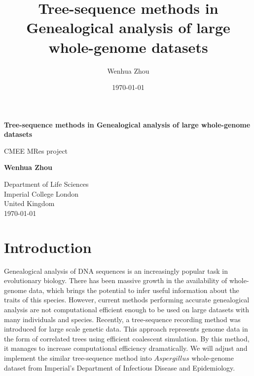 \documentclass[11pt]{article}
\begin{document}
\begin{titlepage}
   \begin{center}
       \vspace*{1cm}
 
       {\huge \textbf{Tree-sequence methods in Genealogical analysis of large whole-genome datasets}}
       
       \vspace{0.5cm}
       
       CMEE MRes project
       
       \vspace{1.5cm}
 
       \textbf{Wenhua Zhou}
       
       \vspace{0.5cm}
       
       
       \vspace{1.5cm}
       
       
       \vspace{0.5cm}
       
       \vfill
 
 
       \vspace{0.8cm}
 
 
       Department of Life Sciences\\
       Imperial College London\\
       United Kingdom\\
       \today
 
   \end{center}
\end{titlepage}


\title{Tree-sequence methods in Genealogical analysis of large whole-genome datasets}
\author{Wenhua Zhou}
\date{\today}

\section{Introduction}
Genealogical analysis of DNA sequences is an increasingly popular task in evolutionary biology. There has been massive growth in the availability of whole-genome data, which brings the potential to infer useful information about the traits of this species. However, current methods performing accurate genealogical analysis are not computational efficient enough to be used on large datasets with many individuals and species. Recently, a tree-sequence recording method \citep{kelleher2016efficient} was introduced for large scale genetic data. This approach represents genome data in the form of correlated trees using efficient coalescent simulation. By this method, it manages to increase computational efficiency dramatically. We will adjust and implement the similar tree-sequence method into $Aspergillus$ whole-genome dataset from Imperial’s Department of Infectious Disease and Epidemiology.
\end{document}
